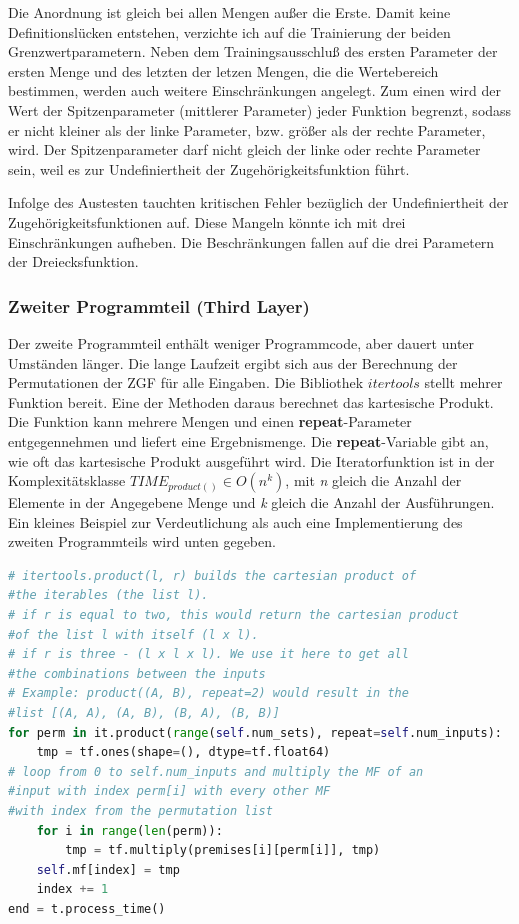 Die Anordnung ist gleich bei allen Mengen außer die Erste. Damit keine
Definitionslücken entstehen, verzichte ich auf die Trainierung der
beiden Grenzwertparametern. Neben dem Trainingsausschluß des ersten
Parameter der ersten Menge und des letzten der letzen Mengen, die die
Wertebereich bestimmen, werden auch weitere Einschränkungen angelegt.
Zum einen wird der Wert der Spitzenparameter (mittlerer Parameter) jeder
Funktion begrenzt, sodass er nicht kleiner als der linke Parameter, bzw.
größer als der rechte Parameter, wird. Der Spitzenparameter darf nicht gleich der linke oder rechte Parameter sein, weil es zur Undefiniertheit der Zugehörigkeitsfunktion führt.

Infolge des Austesten tauchten kritischen Fehler bezüglich der
Undefiniertheit der Zugehörigkeitsfunktionen auf. Diese Mangeln könnte
ich mit drei Einschränkungen aufheben. Die Beschränkungen fallen auf die
drei Parametern der Dreiecksfunktion.


\subsubsection{Zweiter Programmteil (Third Layer)}\label{zweiter-programmteil-third-layer}

Der zweite Programmteil enthält weniger Programmcode, aber dauert unter
Umständen länger. Die lange Laufzeit ergibt sich aus der Berechnung der
Permutationen der ZGF für alle Eingaben. Die Bibliothek
\(\textit{itertools}\) stellt mehrer Funktion bereit. Eine der Methoden
daraus berechnet das kartesische Produkt. Die Funktion kann mehrere
Mengen und einen \textbf{repeat}-Parameter entgegennehmen und liefert
eine Ergebnismenge. Die \textbf{repeat}-Variable gibt an, wie oft das
kartesische Produkt ausgeführt wird. Die Iteratorfunktion ist in der
Komplexitätsklasse \(TIME_{product()} \in O(n^k)\), mit \emph{n} gleich
die Anzahl der Elemente in der Angegebene Menge und \emph{k} gleich die
Anzahl der Ausführungen. Ein kleines Beispiel zur Verdeutlichung als
auch eine Implementierung des zweiten Programmteils wird unten gegeben.

\begin{lstlisting}[language=Python]
# itertools.product(l, r) builds the cartesian product of 
#the iterables (the list l).
# if r is equal to two, this would return the cartesian product 
#of the list l with itself (l x l).
# if r is three - (l x l x l). We use it here to get all 
#the combinations between the inputs
# Example: product((A, B), repeat=2) would result in the 
#list [(A, A), (A, B), (B, A), (B, B)]
for perm in it.product(range(self.num_sets), repeat=self.num_inputs):
	tmp = tf.ones(shape=(), dtype=tf.float64)
# loop from 0 to self.num_inputs and multiply the MF of an 
#input with index perm[i] with every other MF 
#with index from the permutation list
	for i in range(len(perm)):
		tmp = tf.multiply(premises[i][perm[i]], tmp)
	self.mf[index] = tmp
	index += 1
end = t.process_time()
\end{lstlisting}

